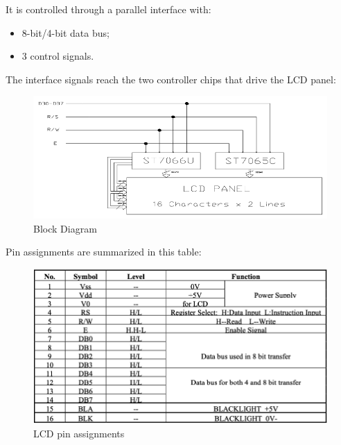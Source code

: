 \documentclass[a4paper, 12pt]{article}
\begin{document}
It is controlled through a parallel interface with:
\begin{itemize}
    \item 8-bit/4-bit data bus;
    \item 3 control signals.
\end{itemize}
The interface signals reach the two controller chips that drive the LCD panel:
\begin{figure}[h]
    \includegraphics[width=14cm]{lcd_signals}
    \centering
    \caption{Block Diagram}
\end{figure}
\newpage
Pin assignments are summarized in this table:
\begin{figure}[h]
    \includegraphics[width=13cm]{lcd_pin_assignments}
    \centering
    \caption{LCD pin assignments}
\end{figure}
\end{document}

